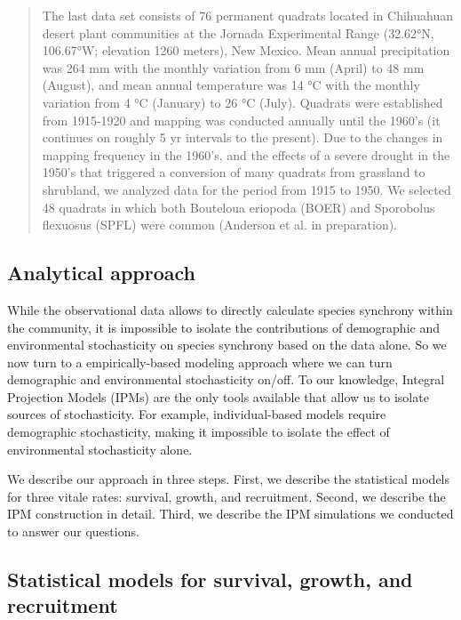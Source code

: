 \documentclass[12pt,]{article}
\begin{document}
\begin{quote}
The last data set consists of 76 permanent quadrats located in
Chihuahuan desert plant communities at the Jornada Experimental Range
(32.62°N, 106.67°W; elevation 1260 meters), New Mexico. Mean annual
precipitation was 264 mm with the monthly variation from 6 mm (April) to
48 mm (August), and mean annual temperature was 14 °C with the monthly
variation from 4 °C (January) to 26 °C (July). Quadrats were established
from 1915-1920 and mapping was conducted annually until the 1960's (it
continues on roughly 5 yr intervals to the present). Due to the changes
in mapping frequency in the 1960's, and the effects of a severe drought
in the 1950's that triggered a conversion of many quadrats from
grassland to shrubland, we analyzed data for the period from 1915 to
1950. We selected 48 quadrats in which both Bouteloua eriopoda (BOER)
and Sporobolus flexuosus (SPFL) were common (Anderson et al. in
preparation).
\end{quote}

\subsection{Analytical approach}\label{analytical-approach}

While the observational data allows to directly calculate species
synchrony within the community, it is impossible to isolate the
contributions of demographic and environmental stochasticity on species
synchrony based on the data alone. So we now turn to a empirically-based
modeling approach where we can turn demographic and environmental
stochasticity on/off. To our knowledge, Integral Projection Models
(IPMs) are the only tools available that allow us to isolate sources of
stochasticity. For example, individual-based models require demographic
stochasticity, making it impossible to isolate the effect of
environmental stochasticity alone.

We describe our approach in three steps. First, we describe the
statistical models for three vitale rates: survival, growth, and
recruitment. Second, we describe the IPM construction in detail. Third,
we describe the IPM simulations we conducted to answer our questions.

\subsection{Statistical models for survival, growth, and
recruitment}\label{statistical-models-for-survival-growth-and-recruitment}
\end{document}
